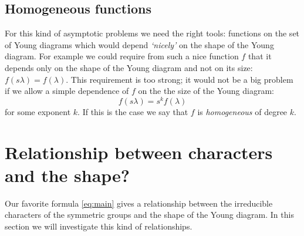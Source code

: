 \documentclass{emsprocart}
\theoremstyle{definition}
\begin{document}
\subsection{Homogeneous functions} 
\label{subsec:homogeneous}
For this kind of asymptotic problems we need the right tools:
functions on the set of Young diagrams which would depend \emph{`nicely'} on the shape of the Young diagram.  
For example we could require from such a nice function $f$ that it depends only
on the shape of the Young diagram and not on its size: $f(s \lambda) = f(\lambda)$.
This requirement is too strong; it would not be a big problem if we allow a simple dependence of $f$ on the the size of the Young diagram:
$$ f(s\lambda) = s^k f(\lambda) $$
for some exponent $k$. If this is the case we say that $f$ is \emph{homogeneous} of degree $k$. 

\section{Relationship between characters and the shape?}

Our favorite formula \eqref{eq:main} gives a relationship between the irreducible characters of the symmetric groups
and the shape of the Young diagram. In this section we will investigate this kind of relationships.
\end{document}

